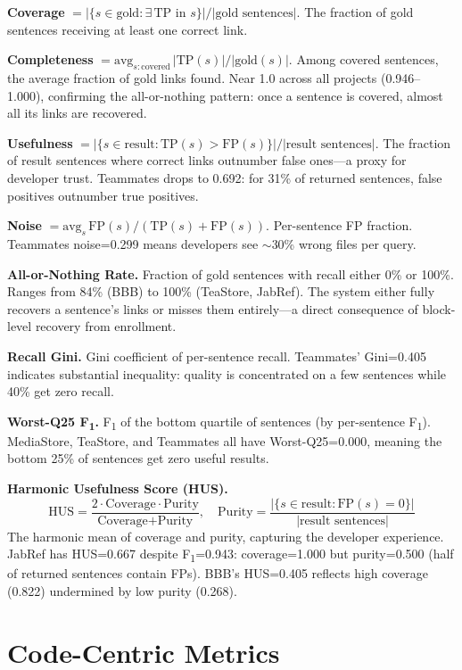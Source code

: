 \documentclass[11pt,a4paper]{report}
\newcommand{\fone}{F\textsubscript{1}\xspace}
\begin{document}
\textbf{Coverage} $= |\{s \in \text{gold} : \exists\,\text{TP in } s\}| / |\text{gold sentences}|$.
The fraction of gold sentences receiving at least one correct link.

\textbf{Completeness} $= \text{avg}_{s:\text{covered}}\, |\text{TP}(s)| / |\text{gold}(s)|$.
Among covered sentences, the average fraction of gold links found. Near 1.0
across all projects (0.946--1.000), confirming the all-or-nothing pattern:
once a sentence is covered, almost all its links are recovered.

\textbf{Usefulness} $= |\{s \in \text{result} : \text{TP}(s) > \text{FP}(s)\}| / |\text{result sentences}|$.
The fraction of result sentences where correct links outnumber false ones---a
proxy for developer trust. Teammates drops to 0.692: for 31\% of returned
sentences, false positives outnumber true positives.

\textbf{Noise} $= \text{avg}_{s}\, \text{FP}(s) / (\text{TP}(s) + \text{FP}(s))$.
Per-sentence FP fraction. Teammates noise=0.299 means developers see $\sim$30\%
wrong files per query.

\textbf{All-or-Nothing Rate.} Fraction of gold sentences with recall either 0\%
or 100\%. Ranges from 84\% (BBB) to 100\% (TeaStore, JabRef). The system
either fully recovers a sentence's links or misses them entirely---a direct
consequence of block-level recovery from enrollment.

\textbf{Recall Gini.} Gini coefficient of per-sentence recall. Teammates'
Gini=0.405 indicates substantial inequality: quality is concentrated on a few
sentences while 40\% get zero recall.

\textbf{Worst-Q25 \fone.} \fone of the bottom quartile of sentences (by
per-sentence \fone). MediaStore, TeaStore, and Teammates all have
Worst-Q25=0.000, meaning the bottom 25\% of sentences get zero useful results.

\textbf{Harmonic Usefulness Score (HUS).}
\[
\text{HUS} = \frac{2 \cdot \text{Coverage} \cdot \text{Purity}}
{\text{Coverage} + \text{Purity}}, \quad
\text{Purity} = \frac{|\{s \in \text{result} : \text{FP}(s) = 0\}|}
{|\text{result sentences}|}
\]
The harmonic mean of coverage and purity, capturing the developer experience.
JabRef has HUS=0.667 despite \fone=0.943: coverage=1.000 but purity=0.500
(half of returned sentences contain FPs). BBB's HUS=0.405 reflects high
coverage (0.822) undermined by low purity (0.268).


\section{Code-Centric Metrics}
\label{sec:eval:code}
\end{document}
